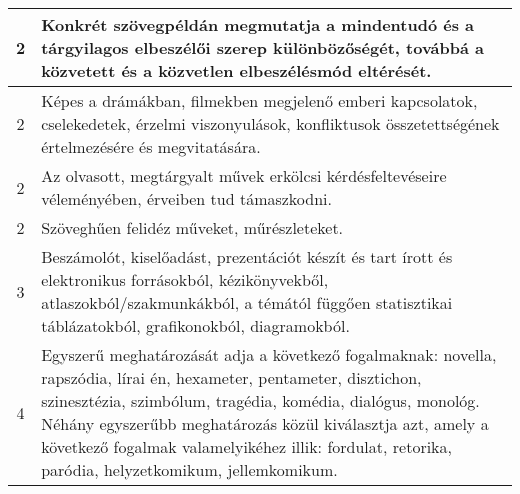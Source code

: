 \begin{longtable}{c | p{} }
                                          2 &  Konkrét szövegpéldán megmutatja a mindentudó és a tárgyilagos elbeszélői szerep különbözőségét, továbbá a közvetett és a közvetlen elbeszélésmód eltérését. \\ \hline
                                          2 &  Képes a drámákban, filmekben megjelenő emberi kapcsolatok, cselekedetek, érzelmi viszonyulások, konfliktusok összetettségének értelmezésére és megvitatására. \\ \hline
                                          2 &  Az olvasott, megtárgyalt művek erkölcsi kérdésfeltevéseire véleményében, érveiben tud támaszkodni. \\ \hline
                                          2 &  Szöveghűen felidéz műveket, műrészleteket. \\ \hline
                                      
                                
                                          3 &  Beszámolót, kiselőadást, prezentációt készít és tart írott és elektronikus forrásokból, kézikönyvekből, atlaszokból/szakmunkákból, a témától függően statisztikai táblázatokból, grafikonokból, diagramokból. \\ \hline
                                      
                                
                                          4 &  Egyszerű meghatározását adja a következő fogalmaknak: novella, rapszódia, lírai én, hexameter, pentameter, disztichon, szinesztézia, szimbólum, tragédia, komédia, dialógus, monológ. Néhány egyszerűbb meghatározás közül kiválasztja azt, amely a következő fogalmak valamelyikéhez illik: fordulat, retorika, paródia, helyzetkomikum, jellemkomikum. \\ \hline
                                      
                        \end{longtable}
            \clearpage

